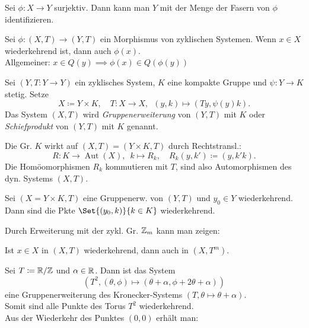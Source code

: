 \documentclass{cheat-sheet}
\DeclareMathOperator{\Aut}{Aut} %
\begin{document}
\begin{bem}
  Sei $\phi : X \to Y$ surjektiv. Dann kann man $Y$ mit der Menge der Fasern von $\phi$ identifizieren.
\end{bem}

\begin{thm}
  Sei $\phi : (X, T) \to (Y, T)$ ein Morphismus von zyklischen Systemen.
  Wenn $x \in X$ wiederkehrend ist, dann auch $\phi(x)$. \\
  Allgemeiner: $x \in Q(y) \implies \phi(x) \in Q(\phi(y))$
\end{thm}

\begin{defn}
  Sei $(Y, T : Y \to Y)$ ein zyklisches System, $K$ eine kompakte Gruppe und $\psi : Y \to K$ stetig. Setze
  \[
    X \coloneqq Y \times K, \quad
    T : X \to X, \enspace (y, k) \mapsto (Ty, \psi(y)k).
  \]
  Das System $(X, T)$ wird \emph{Gruppenerweiterung} von $(Y, T)$ mit $K$ oder \emph{Schiefprodukt} von $(Y, T)$ mit $K$ genannt.
\end{defn}

\begin{bem}
  Die Gr. $K$ wirkt auf $(X, T) = (Y \!\times\! K, T)$ durch Rechtstransl.:
  \[
    R : K \to \Aut(X), \enspace k \mapsto R_k, \quad
    R_k(y,k') \coloneqq (y,k'k).
  \]
  Die Homöomorphismen $R_k$ kommutieren mit $T$, sind also Automorphismen des dyn. Systems $(X, T)$.
\end{bem}

\begin{thm}
  Sei $(X \!=\! Y \!\times\! K, T)$ eine Gruppenerw. von $(Y, T)$ und $y_0 \in Y$ wiederkehrend.
  Dann sind die Pkte $\Set{(y_0, k)}{k \in K}$ wiederkehrend.
\end{thm}

\begin{bem}
  Durch Erweiterung mit der zykl. Gr. $\mathbb{Z}_m$ kann man zeigen:
\end{bem}

\begin{prop}
  Ist $x \in X$ in $(X, T)$ wiederkehrend, dann auch in $(X, T^m)$.
\end{prop}

\begin{bsp}
  Sei $T \coloneqq \mathbb{R} / \mathbb{Z}$ und $\alpha \in \mathbb{R}$. Dann ist das System
  \[ (T^2, (\theta, \phi) \mapsto (\theta + \alpha, \phi + 2 \theta + \alpha)) \]
  eine Gruppenerweiterung des Kronecker-Systems $(T, \theta \mapsto \theta + \alpha)$. \\
  Somit sind alle Punkte des Torus $T^2$ wiederkehrend. \\
  Aus der Wiederkehr des Punktes $(0, 0)$ erhält man:
\end{bsp}
\end{document}
